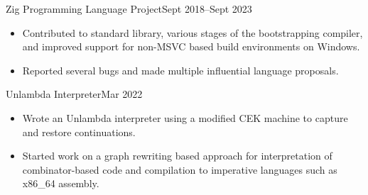 \documentclass[a4paper]{article}
\begin{document}
    \begin{activity}{Zig Programming Language Project}{Sept 2018--Sept 2023}
      \begin{itemize}[topsep=5pt, partopsep=0pt, itemsep=-1pt]
        \item Contributed to standard library, various stages of the bootstrapping compiler, and improved support for non-MSVC based build environments on Windows.
        \item Reported several bugs and made multiple influential language proposals.
      \end{itemize}
    \end{activity}


    \begin{activity}{Unlambda Interpreter}{Mar 2022}
      \begin{itemize}[topsep=5pt, partopsep=0pt, itemsep=-1pt]
        \item Wrote an Unlambda interpreter using a modified CEK machine to capture and restore continuations.
        \item Started work on a graph rewriting based approach for interpretation of combinator-based code and compilation to imperative languages such as x86\_64 assembly.
      \end{itemize}
    \end{activity}

\end{document}

